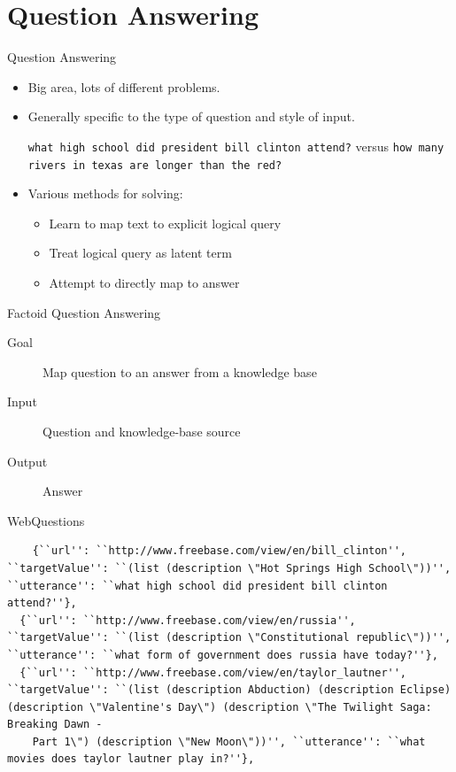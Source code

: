 \documentclass{beamer}
\begin{document}
\section{Question Answering}

\begin{frame}{Question Answering}
  \begin{itemize}
  \item Big area, lots of different problems.
    \air 
  \item Generally specific to the type of question and style of input. 
    \air 

    \texttt{what high school did president bill clinton attend?}
    versus 
    \texttt{how many rivers in texas are longer than the red?}

  \item Various methods for solving:
    \begin{itemize}
    \item Learn to map text to explicit logical query
    \item Treat logical query as latent term 
    \item Attempt to directly map to answer  
    \end{itemize}
  \end{itemize}
\end{frame}

\begin{frame}{Factoid Question Answering}
  \begin{description}
  \item[Goal]Map question to an answer from a  knowledge base 
  \item[Input] Question and knowledge-base source
  \item[Output] Answer
  \end{description}  
\end{frame}

\begin{frame}[fragile]{WebQuestions}
\begin{verbatim}
    {``url'': ``http://www.freebase.com/view/en/bill_clinton'', ``targetValue'': ``(list (description \"Hot Springs High School\"))'', ``utterance'': ``what high school did president bill clinton attend?''},                    
  {``url'': ``http://www.freebase.com/view/en/russia'', ``targetValue'': ``(list (description \"Constitutional republic\"))'', ``utterance'': ``what form of government does russia have today?''},                              
  {``url'': ``http://www.freebase.com/view/en/taylor_lautner'', ``targetValue'': ``(list (description Abduction) (description Eclipse) (description \"Valentine's Day\") (description \"The Twilight Saga: Breaking Dawn -  
    Part 1\") (description \"New Moon\"))'', ``utterance'': ``what movies does taylor lautner play in?''},
\end{verbatim}
\end{frame}
\end{document}
